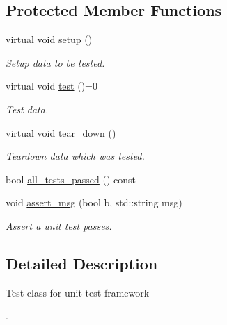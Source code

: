 \subsection*{Protected Member Functions}
\begin{DoxyCompactItemize}
\item 
\hypertarget{classtest__class_a522c266a03c3aab7abc9b49e478e9154}{virtual void \hyperlink{classtest__class_a522c266a03c3aab7abc9b49e478e9154}{setup} ()}\label{classtest__class_a522c266a03c3aab7abc9b49e478e9154}

\begin{DoxyCompactList}\small\item\em Setup data to be tested. \end{DoxyCompactList}\item 
\hypertarget{classtest__class_ac0745ab8bcb4a3ff2d13b4c39c661215}{virtual void \hyperlink{classtest__class_ac0745ab8bcb4a3ff2d13b4c39c661215}{test} ()=0}\label{classtest__class_ac0745ab8bcb4a3ff2d13b4c39c661215}

\begin{DoxyCompactList}\small\item\em Test data. \end{DoxyCompactList}\item 
\hypertarget{classtest__class_a1231dba15477ba378c4a68995d3278cd}{virtual void \hyperlink{classtest__class_a1231dba15477ba378c4a68995d3278cd}{tear\+\_\+down} ()}\label{classtest__class_a1231dba15477ba378c4a68995d3278cd}

\begin{DoxyCompactList}\small\item\em Teardown data which was tested. \end{DoxyCompactList}\item 
bool \hyperlink{classtest__class_ac1111bb2bbb3a7870e5092cd5e6aee9b}{all\+\_\+tests\+\_\+passed} () const 
\item 
void \hyperlink{classtest__class_ac2a04ec6f3764fcfcd92fdefb205331a}{assert\+\_\+msg} (bool b, std\+::string msg)
\begin{DoxyCompactList}\small\item\em Assert a unit test passes. \end{DoxyCompactList}\end{DoxyCompactItemize}


\subsection{Detailed Description}
Test class for unit test framework \begin{DoxyVerb}\end{DoxyVerb}
. 

